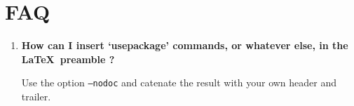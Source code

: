 \documentclass[12pt]{article}
\begin{document}
\section{FAQ}

\begin{enumerate}
\item \textbf{How can I insert `usepackage' commands, or whatever else,
  in the \LaTeX\ preamble ?} ~\par

  Use the option \texttt{--nodoc} and catenate the result with your
  own header and trailer.

\end{enumerate}



\end{document}
